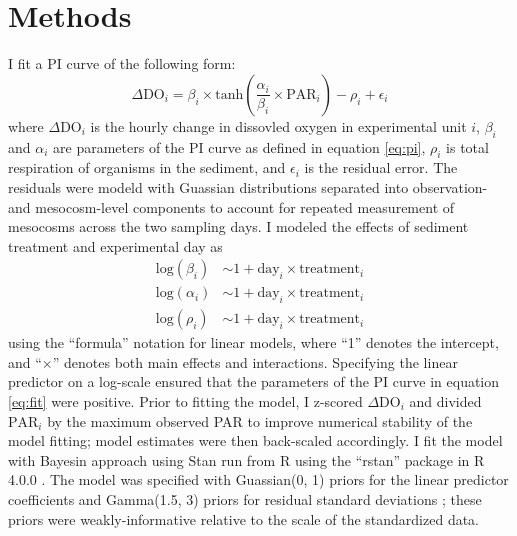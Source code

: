 

\section*{Methods}

I fit a PI curve of the following form:
%
\begin{equation} \label{eq:fit}
  \Delta \text{DO}_i = 
    \beta_i \times \text{tanh}\left(\frac{\alpha_i} {\beta_i} \times \text{PAR}_i\right)
      - \rho_i + \epsilon_i
\end{equation}
%
where $\Delta \text{DO}_i$ is the hourly change in dissovled oxygen 
in experimental unit $i$, 
$\beta_i$ and $\alpha_i$ are parameters of the PI curve as defined in equation \ref{eq:pi},
$\rho_i$ is total respiration of organisms in the sediment,
and $\epsilon_i$ is the residual error.
The residuals were modeld with Guassian distributions 
separated into observation- and mesocosm-level components
to account for repeated measurement of mesocosms across the two sampling days.
I modeled the effects of sediment treatment and experimental day as
%
\begin{equation} \label{eq:lm}
\begin{split}
\text{log}(\beta_i) &\sim 1 + \text{day}_i \times \text{treatment}_i \\
\text{log}(\alpha_i) &\sim 1 + \text{day}_i \times \text{treatment}_i \\
\text{log}(\rho_i) &\sim 1 + \text{day}_i \times \text{treatment}_i
\end{split}
\end{equation}
%
using the ``formula'' notation for linear models, 
where ``1'' denotes the intercept,
and ``$\times$'' denotes both main effects and interactions.
Specifying the linear predictor on a log-scale ensured that the parameters 
of the PI curve in equation \ref{eq:fit} were positive.
Prior to fitting the model, I z-scored 
$\Delta \text{DO}_i$ and divided $\text{PAR}_i$ by the maximum observed PAR 
to improve numerical stability of the model fitting; 
model estimates were then back-scaled accordingly.
I fit the model with Bayesin approach using Stan \citep{carpenter2017}
run from R using the ``rstan'' package \citep{stan2018} in R 4.0.0 \citep{r}.
The model was specified with Guassian(0, 1) priors for the linear predictor coefficients  
and Gamma(1.5, 3) priors for residual standard deviations \citep{chung2015};
these priors were weakly-informative relative to the scale of the standardized data.

